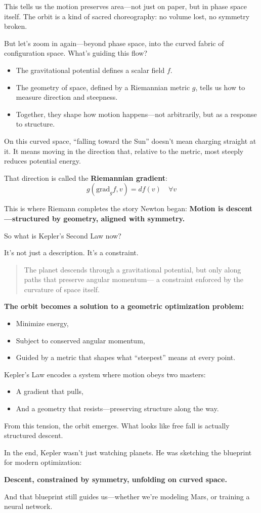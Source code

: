 This tells us the motion preserves area—not just on paper, but in phase space itself. The orbit is a kind of sacred choreography: no volume lost, no symmetry broken.

But let’s zoom in again—beyond phase space, into the curved fabric of configuration space. What’s guiding this flow?

\begin{itemize}
  \item The gravitational potential defines a scalar field \( f \).
  \item The geometry of space, defined by a Riemannian metric \( g \), tells us how to measure direction and steepness.
  \item Together, they shape how motion happens—not arbitrarily, but as a response to structure.
\end{itemize}

On this curved space, “falling toward the Sun” doesn’t mean charging straight at it. It means moving in the direction that, relative to the metric, most steeply reduces potential energy.

That direction is called the \textbf{Riemannian gradient}:
\[
g(\text{grad}_g f, v) = df(v) \quad \forall v
\]

This is where Riemann completes the story Newton began:  
\textbf{Motion is descent—structured by geometry, aligned with symmetry.}

So what is Kepler’s Second Law now?

It’s not just a description. It’s a constraint.

\begin{quote}
The planet descends through a gravitational potential,  
but only along paths that preserve angular momentum—  
a constraint enforced by the curvature of space itself.
\end{quote}

\textbf{The orbit becomes a solution to a geometric optimization problem:}

\begin{itemize}
  \item Minimize energy,  
  \item Subject to conserved angular momentum,  
  \item Guided by a metric that shapes what “steepest” means at every point.
\end{itemize}

\begin{tcolorbox}[colback=blue!5!white, colframe=blue!50!black,
title={Kepler’s Law as Gradient-Constrained Motion}]
Kepler’s Law encodes a system where motion obeys two masters:

\begin{itemize}
  \item A gradient that pulls,
  \item And a geometry that resists—preserving structure along the way.
\end{itemize}

From this tension, the orbit emerges.  
What looks like free fall is actually structured descent.
\end{tcolorbox}

In the end, Kepler wasn’t just watching planets.  
He was sketching the blueprint for modern optimization:

\textbf{Descent, constrained by symmetry, unfolding on curved space.}

And that blueprint still guides us—whether we’re modeling Mars, or training a neural network.
